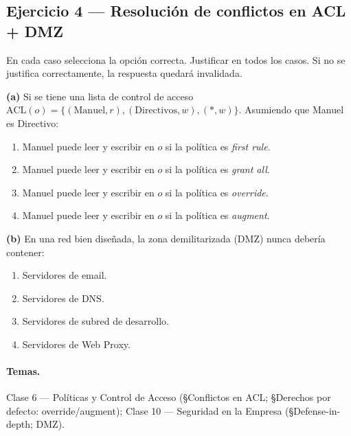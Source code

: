 \subsection{Ejercicio 4 — Resolución de conflictos en ACL + DMZ}

\begin{consigna}
En cada caso selecciona la opción correcta. Justificar en todos los casos. Si no se justifica correctamente, la respuesta quedará invalidada.

\medskip
\textbf{(a)} Si se tiene una lista de control de acceso $\mathrm{ACL}(o) = \{(\text{Manuel}, r), (\text{Directivos}, w), (\ast, w)\}$. Asumiendo que Manuel es Directivo:
\begin{enumerate}
  \item Manuel puede leer y escribir en $o$ si la política es \emph{first rule}.
  \item Manuel puede leer y escribir en $o$ si la política es \emph{grant all}.
  \item Manuel puede leer y escribir en $o$ si la política es \emph{override}.
  \item Manuel puede leer y escribir en $o$ si la política es \emph{augment}.
\end{enumerate}

\textbf{(b)} En una red bien diseñada, la zona demilitarizada (DMZ) nunca debería contener:
\begin{enumerate}
  \item Servidores de email.
  \item Servidores de DNS.
  \item Servidores de subred de desarrollo.
  \item Servidores de Web Proxy.
\end{enumerate}
\end{consigna}

\paragraph{Temas.}
Clase 6 — Políticas y Control de Acceso (\S Conflictos en ACL; \S Derechos por defecto: override/augment); Clase 10 — Seguridad en la Empresa (\S Defense-in-depth; DMZ).

